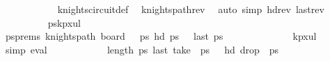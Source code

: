 \begin{isabellebody}
\ \ \ \ \ \ \ \ \ \ \isamarkupfalse%
\ knights{\isacharunderscore}{\kern0pt}circuit{\isacharunderscore}{\kern0pt}def\ \isamarkupfalse%
\ knights{\isacharunderscore}{\kern0pt}path{\isacharunderscore}{\kern0pt}rev\ \isamarkupfalse%
\ {\isacharparenleft}{\kern0pt}auto\ simp{\isacharcolon}{\kern0pt}\ hd{\isacharunderscore}{\kern0pt}rev\ last{\isacharunderscore}{\kern0pt}rev{\isacharparenright}{\kern0pt}\isanewline
\isanewline
\ \ \ \ \ \ \ \ \isamarkupfalse%
\ {\isacharquery}{\kern0pt}pskp{}x{}ul{\isachardoublequoteclose}\isanewline
\ \ \ \ \ \ \ \ \isamarkupfalse%
\ psprems{\isacharcolon}{\kern0pt}\ {\isachardoublequoteopen}knights{\isacharunderscore}{\kern0pt}path\ {\isacharparenleft}{\kern0pt}board\ {}\ {}{\isacharparenright}{\kern0pt}\ {\isacharquery}{\kern0pt}ps\ {\isachardoublequoteopen}hd\ {\isacharquery}{\kern0pt}ps\ {\isacharequal}{\kern0pt}\ {\isacharparenleft}{\kern0pt}{}{\isacharcomma}{\kern0pt}{}{\isacharparenright}{\kern0pt}{\isachardoublequoteclose}\ {\isachardoublequoteopen}last\ {\isacharquery}{\kern0pt}ps\ {\isacharequal}{\kern0pt}\ {\isacharparenleft}{\kern0pt}{}{\isacharcomma}{\kern0pt}{}{\isacharparenright}{\kern0pt}{\isachardoublequoteclose}\isanewline
\ \ \ \ \ \ \ \ \ \ \isamarkupfalse%
\ kp{\isacharunderscore}{\kern0pt}{}x{}{\isacharunderscore}{\kern0pt}ul\ \isamarkupfalse%
\ simp\ eval{\isacharplus}{\kern0pt}\isanewline
\isanewline
\ \ \ \ \ \ \ \ \isamarkupfalse%
\ {\isachardoublequoteopen}{}{}\ {\isacharless}{\kern0pt}\ length\ {\isacharquery}{\kern0pt}ps\ {\isachardoublequoteopen}last\ {\isacharparenleft}{\kern0pt}take\ {}{}\ {\isacharquery}{\kern0pt}ps\ {\isacharequal}{\kern0pt}\ {\isacharparenleft}{\kern0pt}{}{\isacharcomma}{\kern0pt}{}{\isacharparenright}{\kern0pt}{\isachardoublequoteclose}\ {\isachardoublequoteopen}hd\ {\isacharparenleft}{\kern0pt}drop\ {}{}\ {\isacharquery}{\kern0pt}ps\ {\isacharequal}{\kern0pt}\ {\isacharparenleft}{\kern0pt}{}{\isacharcomma}{\kern0pt}{}{\isacharparenright}{\kern0pt}{\isachardoublequoteclose}\ \isamarkupfalse%

\end{isabellebody}
